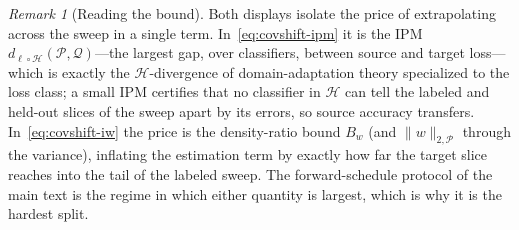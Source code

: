 \documentclass[aps,prresearch,reprint,amsmath,amssymb,nofootinbib,superscriptaddress,floatfix]{revtex4-2}
\theoremstyle{definition}
\theoremstyle{remark}
\newtheorem{remark}[theorem]{Remark}
\theoremstyle{plain}
\begin{document}
\begin{remark}[Reading the bound]
\label{rem:covshift}
Both displays isolate the price of extrapolating across the sweep in a single term. In~\eqref{eq:covshift-ipm}
it is the IPM $d_{\ell\circ\mathcal H}(\mathcal P,\mathcal Q)$---the largest gap, over classifiers, between
source and target loss---which is exactly the $\mathcal H$-divergence of domain-adaptation theory
\cite{bendavid2010theory} specialized to the loss class; a small IPM certifies that no classifier in
$\mathcal H$ can tell the labeled and held-out slices of the sweep apart by its errors, so source accuracy
transfers. In~\eqref{eq:covshift-iw} the price is the density-ratio bound $B_w$ (and $\|w\|_{2,\mathcal P}$
through the variance), inflating the estimation term by exactly how far the target slice reaches into the
tail of the labeled sweep. The forward-schedule protocol of the main text is the regime in which either
quantity is largest, which is why it is the hardest split.
\end{remark}
\end{document}
